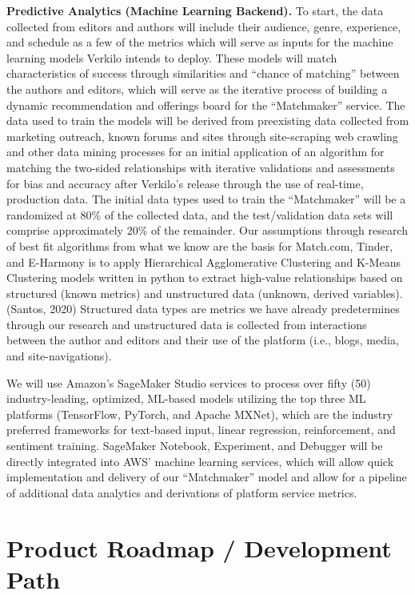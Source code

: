 \documentclass[11pt,openany]{book}
\begin{document}
\textbf{Predictive Analytics (Machine Learning Backend).} To start, the
data collected from editors and authors will include their audience,
genre, experience, and schedule as a few of the metrics which will serve
as inputs for the machine learning models Verkilo intends to deploy.
These models will match characteristics of success through similarities
and ``chance of matching'' between the authors and editors, which will
serve as the iterative process of building a dynamic recommendation and
offerings board for the ``Matchmaker'' service. The data used to train
the models will be derived from preexisting data collected from
marketing outreach, known forums and sites through site-scraping web
crawling and other data mining processes for an initial application of
an algorithm for matching the two-sided relationships with iterative
validations and assessments for bias and accuracy after Verkilo's
release through the use of real-time, production data. The initial data
types used to train the ``Matchmaker'' will be a randomized at 80\% of
the collected data, and the test/validation data sets will comprise
approximately 20\% of the remainder. Our assumptions through research of
best fit algorithms from what we know are the basis for Match.com,
Tinder, and E-Harmony is to apply Hierarchical Agglomerative Clustering
and K-Means Clustering models written in python to extract high-value
relationships based on structured (known metrics) and unstructured data
(unknown, derived variables). (Santos, 2020) Structured data types are
metrics we have already predetermines through our research and
unstructured data is collected from interactions between the author and
editors and their use of the platform (i.e., blogs, media, and
site-navigations).

We will use Amazon's SageMaker Studio services to process over fifty
(50) industry-leading, optimized, ML-based models utilizing the top
three ML platforms (TensorFlow, PyTorch, and Apache MXNet), which are
the industry preferred frameworks for text-based input, linear
regression, reinforcement, and sentiment training. SageMaker Notebook,
Experiment, and Debugger will be directly integrated into AWS' machine
learning services, which will allow quick implementation and delivery of
our ``Matchmaker'' model and allow for a pipeline of additional data
analytics and derivations of platform service metrics.

\hypertarget{product-roadmap-development-path}{%
\section{Product Roadmap / Development
Path}\label{product-roadmap-development-path}}
\end{document}
